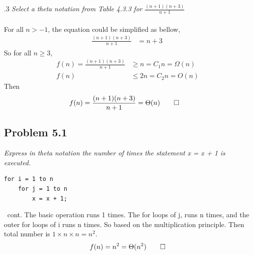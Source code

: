 \documentclass{beamer}
\begin{document}
        \begin{frame}[c,shrink]{\subsecname{}.3}
            \textit{Select a theta notation from Table 4.3.3 for $\frac{(n+1)(n+3)}{n+1}$}\\
            $\;$\\\pause  
            For all $n > -1$, the equation could be simplified as bellow,   
            \begin{align*}
                \frac{(n+1)(n+3)}{n+1}			&= n+3\ 
            \end{align*}\pause
            So for all $n \geq 3$,
            \begin{align*}
                f(n) = \frac{(n+1)(n+3)}{n+1} &\geq n = C_1n = \Omega(n)\\
                                         f(n) &\leq 2n = C_2n = O(n)
            \end{align*} \pause
            Then           
            \begin{align*}
                f(n) = \frac{(n+1)(n+3)}{n+1} &= \Theta(n) \qed
            \end{align*}
        \end{frame}
        
        
        
    \subsection{Problem 5.1}
    
        \begin{frame}[c,containsverbatim]{\subsecname}
            \textit{Express in theta notation the number of times the statement x = x + 1 is
executed.}
            \begin{lstlisting}
for i = 1 to n
    for j = 1 to n
        x = x + 1;
            \end{lstlisting}
        \end{frame}
        
        \begin{frame}[c]{\subsecname\ cont.}
            The basic operation runs 1 times. The for loops of j, runs n times, and the outer for loops of i runs n times. So based on the multiplication principle. Then total number is $1\times n \times n=n^2$.\pause
            \begin{align*}
            f(n)=n^2=\Theta(n^2) \qed
            \end{align*}
        \end{frame}
        
\end{document}
